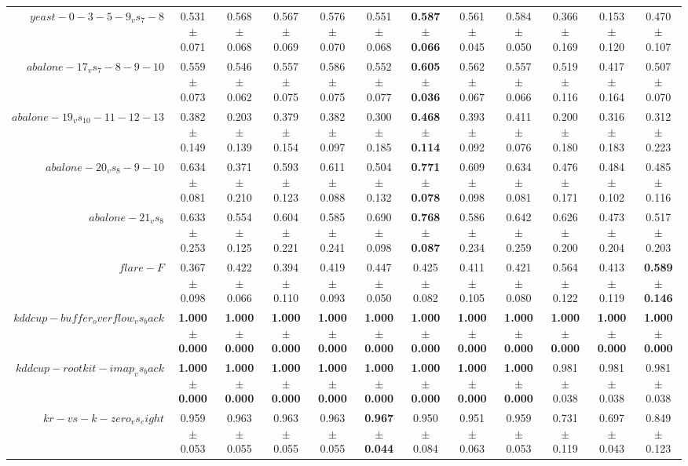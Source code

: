 \begin{table}[!ht]
{\begin{tabular}{r c c c c c c c c c c c}
$yeast-0-3-5-9_vs_7-8$ & 0.531 $\pm$ 0.071 & 0.568 $\pm$ 0.068 & 0.567 $\pm$ 0.069 & 0.576 $\pm$ 0.070 & 0.551 $\pm$ 0.068 & \textbf{0.587 $\pm$ 0.066} & 0.561 $\pm$ 0.045 & 0.584 $\pm$ 0.050 & 0.366 $\pm$ 0.169 & 0.153 $\pm$ 0.120 & 0.470 $\pm$ 0.107 \\
$abalone-17_vs_7-8-9-10$ & 0.559 $\pm$ 0.073 & 0.546 $\pm$ 0.062 & 0.557 $\pm$ 0.075 & 0.586 $\pm$ 0.075 & 0.552 $\pm$ 0.077 & \textbf{0.605 $\pm$ 0.036} & 0.562 $\pm$ 0.067 & 0.557 $\pm$ 0.066 & 0.519 $\pm$ 0.116 & 0.417 $\pm$ 0.164 & 0.507 $\pm$ 0.070 \\
$abalone-19_vs_10-11-12-13$ & 0.382 $\pm$ 0.149 & 0.203 $\pm$ 0.139 & 0.379 $\pm$ 0.154 & 0.382 $\pm$ 0.097 & 0.300 $\pm$ 0.185 & \textbf{0.468 $\pm$ 0.114} & 0.393 $\pm$ 0.092 & 0.411 $\pm$ 0.076 & 0.200 $\pm$ 0.180 & 0.316 $\pm$ 0.183 & 0.312 $\pm$ 0.223 \\
$abalone-20_vs_8-9-10$ & 0.634 $\pm$ 0.081 & 0.371 $\pm$ 0.210 & 0.593 $\pm$ 0.123 & 0.611 $\pm$ 0.088 & 0.504 $\pm$ 0.132 & \textbf{0.771 $\pm$ 0.078} & 0.609 $\pm$ 0.098 & 0.634 $\pm$ 0.081 & 0.476 $\pm$ 0.171 & 0.484 $\pm$ 0.102 & 0.485 $\pm$ 0.116 \\
$abalone-21_vs_8$ & 0.633 $\pm$ 0.253 & 0.554 $\pm$ 0.125 & 0.604 $\pm$ 0.221 & 0.585 $\pm$ 0.241 & 0.690 $\pm$ 0.098 & \textbf{0.768 $\pm$ 0.087} & 0.586 $\pm$ 0.234 & 0.642 $\pm$ 0.259 & 0.626 $\pm$ 0.200 & 0.473 $\pm$ 0.204 & 0.517 $\pm$ 0.203 \\
$flare-F$ & 0.367 $\pm$ 0.098 & 0.422 $\pm$ 0.066 & 0.394 $\pm$ 0.110 & 0.419 $\pm$ 0.093 & 0.447 $\pm$ 0.050 & 0.425 $\pm$ 0.082 & 0.411 $\pm$ 0.105 & 0.421 $\pm$ 0.080 & 0.564 $\pm$ 0.122 & 0.413 $\pm$ 0.119 & \textbf{0.589 $\pm$ 0.146} \\
$kddcup-buffer_overflow_vs_back$ & \textbf{1.000 $\pm$ 0.000} & \textbf{1.000 $\pm$ 0.000} & \textbf{1.000 $\pm$ 0.000} & \textbf{1.000 $\pm$ 0.000} & \textbf{1.000 $\pm$ 0.000} & \textbf{1.000 $\pm$ 0.000} & \textbf{1.000 $\pm$ 0.000} & \textbf{1.000 $\pm$ 0.000} & \textbf{1.000 $\pm$ 0.000} & \textbf{1.000 $\pm$ 0.000} & \textbf{1.000 $\pm$ 0.000} \\
$kddcup-rootkit-imap_vs_back$ & \textbf{1.000 $\pm$ 0.000} & \textbf{1.000 $\pm$ 0.000} & \textbf{1.000 $\pm$ 0.000} & \textbf{1.000 $\pm$ 0.000} & \textbf{1.000 $\pm$ 0.000} & \textbf{1.000 $\pm$ 0.000} & \textbf{1.000 $\pm$ 0.000} & \textbf{1.000 $\pm$ 0.000} & 0.981 $\pm$ 0.038 & 0.981 $\pm$ 0.038 & 0.981 $\pm$ 0.038 \\
$kr-vs-k-zero_vs_eight$ & 0.959 $\pm$ 0.053 & 0.963 $\pm$ 0.055 & 0.963 $\pm$ 0.055 & 0.963 $\pm$ 0.055 & \textbf{0.967 $\pm$ 0.044} & 0.950 $\pm$ 0.084 & 0.951 $\pm$ 0.063 & 0.959 $\pm$ 0.053 & 0.731 $\pm$ 0.119 & 0.697 $\pm$ 0.043 & 0.849 $\pm$ 0.123 \\

\end{tabular}}
\end{table}
